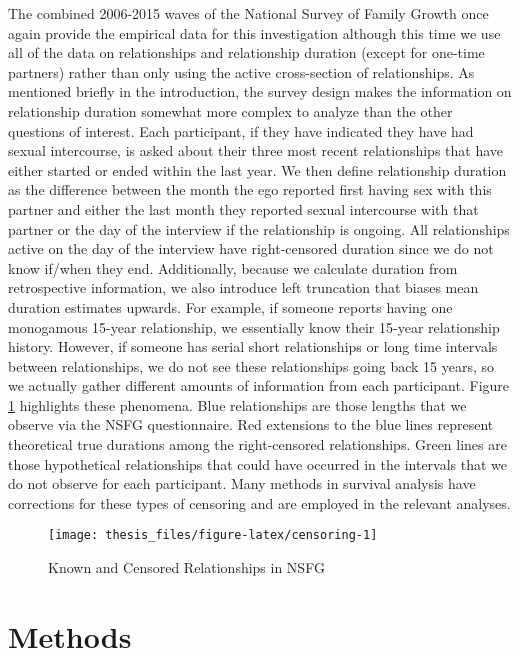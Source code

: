 \documentclass [11pt, proquest] {uwthesis}[2015/03/03]
\begin{document}
The combined 2006-2015 waves of the National Survey of Family Growth
once again provide the empirical data for this investigation although
this time we use all of the data on relationships and relationship
duration (except for one-time partners) rather than only using the
active cross-section of relationships. As mentioned briefly in the
introduction, the survey design makes the information on relationship
duration somewhat more complex to analyze than the other questions of
interest. Each participant, if they have indicated they have had sexual
intercourse, is asked about their three most recent relationships that
have either started or ended within the last year. We then define
relationship duration as the difference between the month the ego
reported first having sex with this partner and either the last month
they reported sexual intercourse with that partner or the day of the
interview if the relationship is ongoing. All relationships active on
the day of the interview have right-censored duration since we do not
know if/when they end. Additionally, because we calculate duration from
retrospective information, we also introduce left truncation that biases
mean duration estimates upwards. For example, if someone reports having
one monogamous 15-year relationship, we essentially know their 15-year
relationship history. However, if someone has serial short relationships
or long time intervals between relationships, we do not see these
relationships going back 15 years, so we actually gather different
amounts of information from each participant. Figure \ref{fig:censoring}
highlights these phenomena. Blue relationships are those lengths that we
observe via the NSFG questionnaire. Red extensions to the blue lines
represent theoretical true durations among the right-censored
relationships. Green lines are those hypothetical relationships that
could have occurred in the intervals that we do not observe for each
participant. Many methods in survival analysis have corrections for
these types of censoring and are employed in the relevant analyses.
\begin{figure}

{\centering \texttt{[image: thesis\_files/figure-latex/censoring-1]} 

}

\caption{Known and Censored Relationships in NSFG}\label{fig:censoring}
\end{figure}
\section{Methods}\label{methods}
\end{document}
